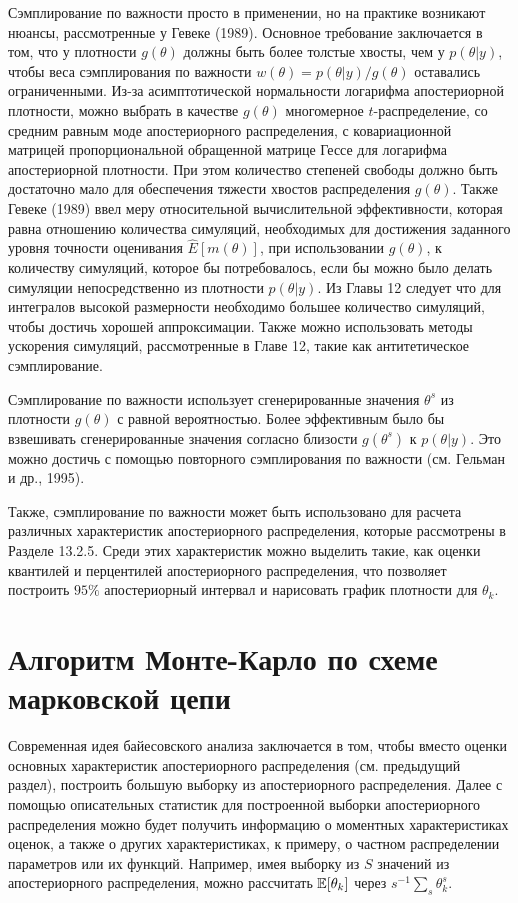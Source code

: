 Сэмплирование по важности просто в применении, но на практике возникают нюансы, рассмотренные  у Гевеке (1989). 
Основное требование заключается в том, что у плотности $g(\theta)$ должны быть более толстые хвосты, чем у $p(\theta|y)$, чтобы веса сэмплирования по важности $w(\theta)=p(\theta|y)/g(\theta)$ оставались ограниченными. 
Из-за асимптотической нормальности логарифма апостериорной плотности, можно выбрать в качестве $g(\theta)$  многомерное $t$-распределение, со средним равным моде апостериорного распределения, с ковариационной матрицей пропорциональной обращенной матрице Гессе для логарифма апостериорной плотности. При этом количество степеней свободы должно быть достаточно мало для обеспечения тяжести хвостов распределения $g(\theta)$. Также Гевеке (1989) ввел меру относительной вычислительной эффективности, которая равна отношению количества симуляций, необходимых для достижения заданного уровня точности оценивания $\hat{E}[m(\theta)]$, при использовании $g(\theta)$, к количеству симуляций, которое бы потребовалось, если бы можно было делать симуляции непосредственно из плотности  $p(\theta|y)$. Из Главы 12 следует что для интегралов высокой размерности необходимо большее количество симуляций, чтобы достичь хорошей аппроксимации. Также можно использовать методы ускорения симуляций, рассмотренные в Главе 12, такие как антитетическое сэмплирование.

Сэмплирование по важности использует сгенерированные значения $\theta^s$ из плотности $g(\theta)$ с равной вероятностью. Более эффективным было бы взвешивать сгенерированные значения согласно близости  $g(\theta^s)$ к $p(\theta|y)$. Это можно достичь с помощью повторного сэмплирования по важности (см. Гельман и др., 1995).

Также, сэмплирование по важности может быть использовано для расчета различных характеристик апостериорного распределения, которые рассмотрены в Разделе 13.2.5. Среди этих характеристик  можно выделить такие, как оценки квантилей и перцентилей апостериорного распределения, что позволяет построить $95\%$ апостериорный интервал и нарисовать график плотности для $\theta_k$.

\section{Алгоритм Монте-Карло по схеме марковской цепи}

Современная идея байесовского анализа заключается в том, чтобы вместо оценки основных характеристик апостериорного распределения (см. предыдущий раздел), построить большую выборку из апостериорного распределения. Далее с помощью описательных статистик для построенной выборки апостериорного распределения можно будет получить информацию о моментных характеристиках  оценок, а также о других характеристиках, к примеру, о частном распределении параметров или их функций. Например, имея выборку из $S$ значений из апостериорного распределения, можно рассчитать $\mathbb{E}[\theta_k]$ через $s^{-1}\sum_{s}\theta^{s}_k$.

